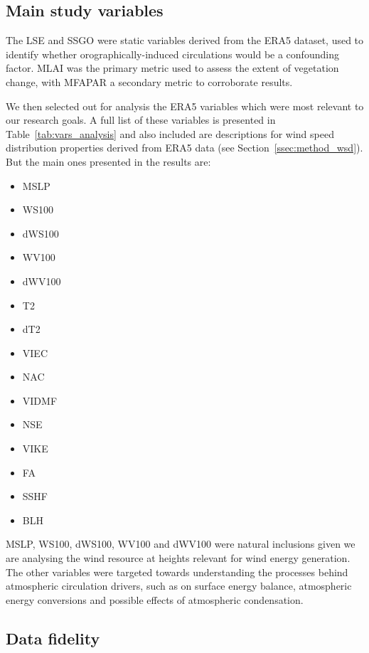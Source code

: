 \subsection{Main study variables}

The \acf{LSE} and \acf{SSGO} were static variables derived from the \ac{ERA5} dataset, used to identify whether orographically-induced circulations would be a confounding factor. \acf{MLAI} was the primary metric used to assess the extent of vegetation change, with \acf{MFAPAR} a secondary metric to corroborate results. 

We then selected out for analysis the \ac{ERA5} variables which were most relevant to our research goals. A full list of these variables is presented in Table~\ref{tab:vars_analysis} and also included are descriptions for wind speed distribution properties derived from \ac{ERA5} data (see Section~\ref{ssec:method_wsd}). But the main ones presented in the results are:
\begin{itemize}
	\item \acf{MSLP}
	\item \acf{WS100}
	\item \acf{dWS100}
	\item \acf{WV100}
	\item \acf{dWV100}
	\item \acf{T2}
	\item \acf{dT2}
	\item \acf{VIEC}
	\item \acf{NAC}
	\item \acf{VIDMF}
	\item \acf{NSE}
	\item \acf{VIKE}
	\item \acf{FA}
	\item \acf{SSHF}
	\item \acf{BLH}
\end{itemize}

\ac{MSLP}, \ac{WS100}, \ac{dWS100}, \ac{WV100} and \ac{dWV100} were natural inclusions given we are analysing the wind resource at heights relevant for wind energy generation. The other variables were targeted towards understanding the processes behind atmospheric circulation drivers, such as on surface energy balance, atmospheric energy conversions and possible effects of atmospheric condensation.

\subsection{Data fidelity}

